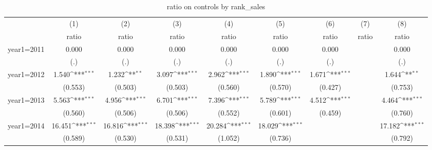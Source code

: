 \begin{table}[htbp]\centering
\def\sym#1{\ifmmode^{#1}\else\(^{#1}\)\fi}
\caption{ratio on controls by rank\_sales}
\begin{tabular}{l*{8}{c}}
\hline\hline
                    &\multicolumn{1}{c}{(1)}&\multicolumn{1}{c}{(2)}&\multicolumn{1}{c}{(3)}&\multicolumn{1}{c}{(4)}&\multicolumn{1}{c}{(5)}&\multicolumn{1}{c}{(6)}&\multicolumn{1}{c}{(7)}&\multicolumn{1}{c}{(8)}\\
                    &\multicolumn{1}{c}{ratio}&\multicolumn{1}{c}{ratio}&\multicolumn{1}{c}{ratio}&\multicolumn{1}{c}{ratio}&\multicolumn{1}{c}{ratio}&\multicolumn{1}{c}{ratio}&\multicolumn{1}{c}{ratio}&\multicolumn{1}{c}{ratio}\\
\hline
year1=2011          &       0.000         &       0.000         &       0.000         &       0.000         &       0.000         &       0.000         &                     &       0.000         \\
                    &         (.)         &         (.)         &         (.)         &         (.)         &         (.)         &         (.)         &                     &         (.)         \\
[1em]
year1=2012          &       1.540\sym{***}&       1.232\sym{**} &       3.097\sym{***}&       2.962\sym{***}&       1.890\sym{***}&       1.671\sym{***}&                     &       1.644\sym{**} \\
                    &     (0.553)         &     (0.503)         &     (0.503)         &     (0.560)         &     (0.570)         &     (0.427)         &                     &     (0.753)         \\
[1em]
year1=2013          &       5.563\sym{***}&       4.956\sym{***}&       6.701\sym{***}&       7.396\sym{***}&       5.789\sym{***}&       4.512\sym{***}&                     &       4.464\sym{***}\\
                    &     (0.560)         &     (0.506)         &     (0.506)         &     (0.552)         &     (0.601)         &     (0.459)         &                     &     (0.760)         \\
[1em]
year1=2014          &      16.451\sym{***}&      16.816\sym{***}&      18.398\sym{***}&      20.284\sym{***}&      18.029\sym{***}&                     &                     &      17.182\sym{***}\\
                    &     (0.589)         &     (0.530)         &     (0.531)         &     (1.052)         &     (0.736)         &                     &                     &     (0.792)         \\

\end{tabular}
\end{table}
